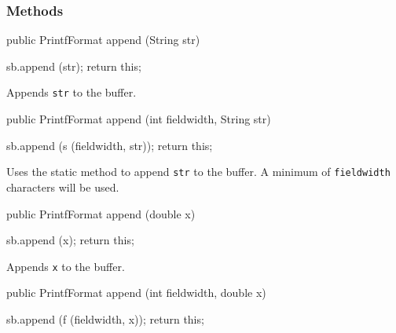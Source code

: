 \subsubsection*{Methods}
\begin{code}

   public PrintfFormat append (String str)\begin{hide} {
      sb.append (str);
      return this;
   }\end{hide}
\end{code}
\begin{tabb}   Appends \texttt{str} to the buffer.
\end{tabb}
\begin{htmlonly}
\end{htmlonly}
\begin{code}

   public PrintfFormat append (int fieldwidth, String str)\begin{hide} {
      sb.append (s (fieldwidth, str));
      return this;
   }\end{hide}
\end{code}
\begin{tabb}   Uses the  static method to append \texttt{str} to the buffer.
   A minimum of \texttt{fieldwidth} characters will be used.
\end{tabb}
\begin{htmlonly}
\end{htmlonly}
\begin{code}

   public PrintfFormat append (double x)\begin{hide} {
      sb.append (x);
      return this;
   }\end{hide}
\end{code}
\begin{tabb}   Appends \texttt{x} to the buffer.
\end{tabb}
\begin{htmlonly}
\end{htmlonly}
\begin{code}

   public PrintfFormat append (int fieldwidth, double x)\begin{hide} {
      sb.append (f (fieldwidth, x));
      return this;
   }\end{hide}
\end{code}
